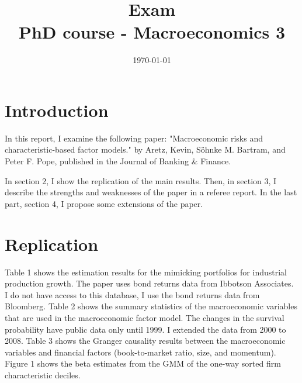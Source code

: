 \documentclass[12pt,a4paper]{ouparticle}
\begin{document}
\title{%
  Exam   \\
  \large PhD course - Macroeconomics 3}

\author{%
}

\date{\today}

\maketitle


\section{Introduction}
In this report, I examine the following paper: "Macroeconomic risks and characteristic-based factor models." by Aretz, Kevin, Söhnke M. Bartram, and Peter F. Pope, published in the Journal of Banking \& Finance.

In section 2, I show the replication of the main results. Then, in section 3, I describe the strengths and weaknesses of the paper in a referee report. In the last part, section 4, I propose some extensions of the paper. 


\section{Replication}
Table 1 shows the estimation results for the mimicking portfolios for industrial production growth. The paper uses bond returns data from Ibbotson Associates. I do not have access to this database, I use the bond returns data from Bloomberg.  Table 2 shows the summary statistics of the macroeconomic variables that are used in the macroeconomic factor model. The changes in the survival probability have public data only until 1999. I extended the data from 2000 to 2008. Table 3 shows the Granger causality results between the macroeconomic variables and financial factors (book-to-market ratio, size, and momentum). Figure 1 shows the beta estimates from the GMM of the one-way sorted firm characteristic deciles. 
\end{document}
